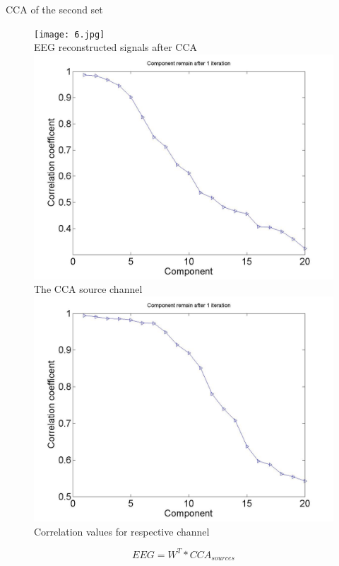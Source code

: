 \documentclass[t,12pt,english
\ifx\beamermode\undefined\else,\beamermode\fi
]{beamer}
\begin{document}
    
\begin{frame}{CCA of the second set}

\begin{figure}[!htbp]
%
\centering
\texttt{[image: 6.jpg]}\\
\tiny{EEG reconstructed signals after CCA}
\endminipage\hfill
{}%
\centering
\includegraphics[width=1\textwidth]{7.jpg}\\
\tiny{The CCA source channel}
\endminipage\hfill
{}%
\centering
\includegraphics[width=1\textwidth]{8.jpg}\\
\tiny{Correlation values for respective channel}
\endminipage\hfill
\end{figure}

\begin{equation}
    EEG=W^{T}*CCA_{sources}
\end{equation}

\end{frame} 
    
\end{document}
